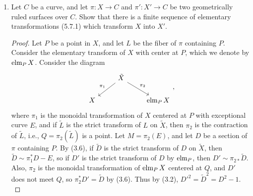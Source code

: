 \documentclass[a4paper]{article}
\begin{document}
\begin{enumerate} [label=\textbf{\arabic*.}, leftmargin=0em]


    \item[\textbf{5.}] Let $C$ be a curve, and let $\pi : X \to C$ and $\pi' : X' \to C$ be two geometrically ruled surfaces over $C$.
          Show that there is a finite sequence of elementary transformations (5.7.1) which transform $X$ into $X'$.

          \begin{proof}
              Let $P$ be a point in $X$, and let $L$ be the fiber of $\pi$ containing $P$.
              Consider the elementary transform of $X$ with center at $P$, which we denote by $\operatorname{elm}_P X$.
              Consider the diagram
              \[ \begin{tikzcd}
                      & \tilde{X} \arrow[ld, "\pi_1"'] \arrow[rd, "\pi_2"] &          \\
                      X &                                                    & \elm_P X
                  \end{tikzcd}, \]
              where $\pi_1$ is the monoidal transformation of $X$ centered at $P$ with exceptional curve $E$, and if $\tilde{L}$ is the strict transform of $L$ on $\tilde{X}$, then $\pi_2$ is the contraction of $\tilde{L}$, i.e., $Q = \pi_2(\tilde{L})$ is a point.
              Let $M = \pi_2(E)$, and let $D$ be a section of $\pi$ containing $P$.
              By (3.6), if $\tilde{D}$ is the strict transform of $D$ on $\tilde{X}$, then $\tilde{D} \sim \pi_1^*D - E$, so if $D'$ is the strict transform of $D$ by $\operatorname{elm}_P$, then $D' \sim \pi_{2*}\tilde{D}$.
              Also, $\pi_2$ is the monoidal transformation of $\operatorname{elm}_P X$ centered at $Q$, and $D'$ does not meet $Q$, so $\pi_2^*D' = \tilde{D}$ by (3.6).
              Thus by (3.2), $D'^2 = \tilde{D}^2 = D^2 - 1.$


\end{proof}
\end{enumerate}
\end{document}
